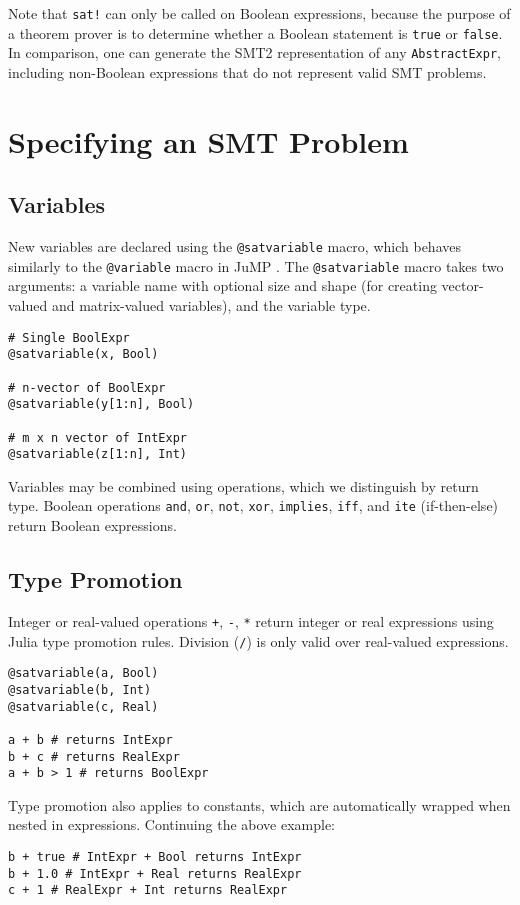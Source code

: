 \documentclass[conference]{IEEEtran}
\begin{document}
Note that \verb|sat!| can only be called on Boolean expressions, because the purpose of a theorem prover is to determine whether a Boolean statement is \verb|true| or \verb|false|. In comparison, one can generate the SMT2 representation of any \verb|AbstractExpr|, including non-Boolean expressions that do not represent valid SMT problems.

\section{Specifying an SMT Problem}
\subsection{Variables}
New variables are declared using the \verb|@satvariable| macro, which behaves similarly to the \verb|@variable| macro in JuMP \cite{Lubin2023}.
The \verb|@satvariable| macro takes two arguments: a variable name with optional size and shape (for creating vector-valued and matrix-valued variables), and the variable type.

\begin{verbatim}
# Single BoolExpr
@satvariable(x, Bool)

# n-vector of BoolExpr
@satvariable(y[1:n], Bool)

# m x n vector of IntExpr
@satvariable(z[1:n], Int)
\end{verbatim}
  
Variables may be combined using operations, which we distinguish by return type.
Boolean operations \verb|and|, \verb|or|, \verb|not|, \verb|xor|, \verb|implies|, \verb|iff|, and \verb|ite| (if-then-else) return Boolean expressions.


\subsection{Type Promotion}
Integer or real-valued operations \verb|+|, \verb|-|, \verb|*| return integer or real expressions using Julia type promotion rules. Division (\verb|/|) is only valid over real-valued expressions.
\begin{verbatim}
@satvariable(a, Bool)
@satvariable(b, Int)
@satvariable(c, Real)

a + b # returns IntExpr
b + c # returns RealExpr
a + b > 1 # returns BoolExpr
\end{verbatim}

Type promotion also applies to constants, which are automatically wrapped when nested in expressions. Continuing the above example:
\begin{verbatim}
b + true # IntExpr + Bool returns IntExpr
b + 1.0 # IntExpr + Real returns RealExpr
c + 1 # RealExpr + Int returns RealExpr
\end{verbatim}
\end{document}
